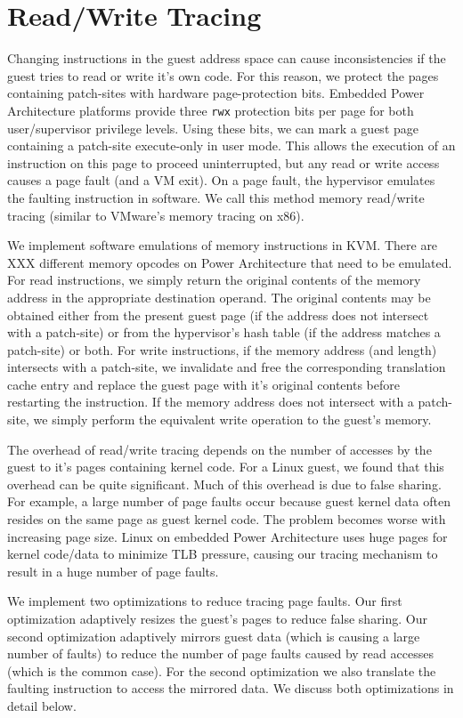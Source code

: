 \documentclass[10pt,twocolumn]{article}
\begin{document}
\section{Read/Write Tracing}
\label{sec:tracing}
Changing instructions in the guest address space can cause
inconsistencies if the guest tries to read or write it's own code.
For this reason, we protect the pages containing patch-sites with hardware
page-protection bits. Embedded Power Architecture platforms provide three {\tt rwx}
protection bits per page for both user/supervisor privilege levels. Using these
bits, we can mark a guest page containing a patch-site
execute-only in user mode. This allows the
execution of an instruction on this page to proceed uninterrupted,
but any read or write access causes a page fault (and a VM exit).
On a page fault, the hypervisor
emulates the faulting instruction in software. We call this
method memory read/write tracing (similar to VMware's memory tracing
on x86\cite{adams:asplos06}).

We implement software emulations of memory instructions in KVM. There are XXX
different memory opcodes on Power Architecture that need to be emulated.
For read instructions, we simply return the original contents of the memory
address in the appropriate destination
operand. The original contents may be obtained either from the present guest
page (if the address does not intersect with a patch-site) or from the hypervisor's
hash table (if the address matches a patch-site) or both.
For write instructions, if the memory address (and length) intersects with a patch-site,
we invalidate and free the corresponding translation cache
entry and replace the guest page with it's original contents before
restarting the instruction. If the memory address does not intersect with a
patch-site, we simply perform the equivalent write operation to the guest's memory.

The overhead of read/write tracing depends on the number of accesses by the guest
to it's pages containing kernel code. For a Linux guest, we found that this overhead
can be quite significant.
Much of this overhead is due to false sharing. For example, a large number of page
faults occur because guest kernel data often resides on the same page as
guest kernel code. The problem becomes worse with increasing page size. Linux
on embedded
Power Architecture uses huge pages for kernel code/data to minimize
TLB pressure, causing our tracing mechanism to result in a huge number of page
faults.

We implement two optimizations to reduce tracing page faults. Our first optimization
adaptively resizes the guest's pages to reduce false sharing.
Our second optimization adaptively
mirrors guest data (which is causing a large number of faults) to reduce the number
of page faults caused by read accesses (which is the common case). For the second
optimization we also translate the faulting instruction to access the mirrored data.
We discuss both optimizations in detail below.
\end{document}
